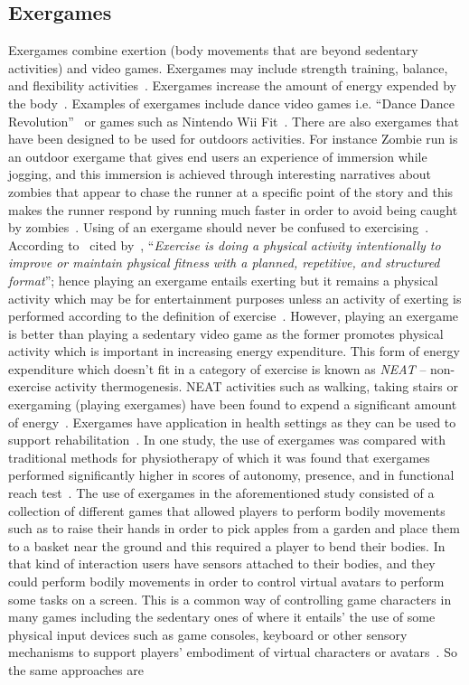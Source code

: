 \subsection{Exergames}
Exergames combine exertion (body movements that are beyond sedentary activities) and video games. Exergames may include strength training, balance, and flexibility activities~\citep{oh2010defining}. Exergames increase the amount of energy expended by the body~\citep{graves2010physiological}. Examples of exergames include  dance video games i.e. ``Dance Dance Revolution''~\citep{lieberman2006dance} or games such as Nintendo Wii Fit~\citep{gobel2010serious}. There are also exergames that have been designed to be used for outdoors activities. For instance Zombie run is an outdoor exergame that gives end users an experience of immersion while jogging, and this immersion is achieved through interesting narratives about zombies that appear to chase the runner at a specific point of the story and this makes the runner respond by running much faster in order to avoid being caught by zombies~\citep{southerton2013zombies}. Using of an exergame should never be confused to exercising~\citep{oh2010defining}. According to~\cite[p. 126]{caspersen1985physical} cited by~\cite{oh2010defining}, ``\emph{Exercise is doing a physical activity intentionally to improve or maintain physical fitness with a planned, repetitive, and structured format}''; hence playing an exergame entails exerting but it remains a physical activity which may be for entertainment purposes unless an activity of exerting is performed according to the definition of exercise~\citep{oh2010defining}. However, playing an exergame is better than playing a sedentary video game as the former promotes physical activity which is important in increasing energy expenditure. This form of energy expenditure which doesn't fit in a category of exercise is known as \emph{NEAT} -- non-exercise activity thermogenesis. NEAT activities such as walking, taking stairs or exergaming (playing exergames) have been found to expend a significant amount of energy~\citep{fujiki2008neat}. Exergames have application in health settings as they can be used to support rehabilitation~\citep{mccallum2012gamification}. In one study, the use of exergames was compared with traditional methods for physiotherapy of which it was found that exergames performed significantly higher in scores of autonomy, presence, and in functional reach test~\citep{smeddinck2015exergames}. The use of exergames in the aforementioned study consisted of a collection of different games that allowed players to perform bodily movements such as to raise their hands in order to pick apples from a garden and place them to a basket near the ground and this required a player to bend their bodies. In that kind of interaction users have sensors attached to their bodies, and they could perform bodily movements in order to control virtual avatars to perform some tasks on a screen. This is a common way of controlling game characters in many games including the sedentary ones of where it entails' the use of some physical input devices such as game consoles, keyboard or other sensory mechanisms to support players' embodiment of virtual characters or avatars~\citep{berkovsky2012physical}. So the same approaches are 